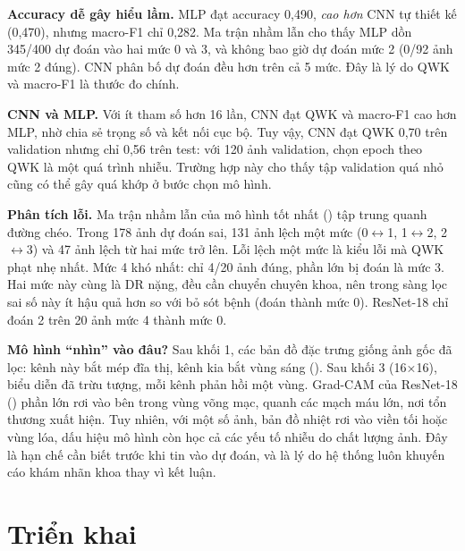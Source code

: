 \textbf{Accuracy dễ gây hiểu lầm.} MLP đạt accuracy 0,490, \emph{cao hơn} CNN tự thiết kế (0,470), nhưng macro-F1 chỉ 0,282. Ma trận nhầm lẫn cho thấy MLP dồn 345/400 dự đoán vào hai mức 0 và 3, và không bao giờ dự đoán mức 2 (0/92 ảnh mức 2 đúng). CNN phân bố dự đoán đều hơn trên cả 5 mức. Đây là lý do QWK và macro-F1 là thước đo chính.

\textbf{CNN và MLP.} Với ít tham số hơn 16 lần, CNN đạt QWK và macro-F1 cao hơn MLP, nhờ chia sẻ trọng số và kết nối cục bộ. Tuy vậy, CNN đạt QWK 0,70 trên validation nhưng chỉ 0,56 trên test: với 120 ảnh validation, chọn epoch theo QWK là một quá trình nhiễu. Trường hợp này cho thấy tập validation quá nhỏ cũng có thể gây quá khớp ở bước chọn mô hình.


\textbf{Phân tích lỗi.} Ma trận nhầm lẫn của mô hình tốt nhất () tập trung quanh đường chéo. Trong 178 ảnh dự đoán sai, 131 ảnh lệch một mức (0$\leftrightarrow$1, 1$\leftrightarrow$2, 2$\leftrightarrow$3) và 47 ảnh lệch từ hai mức trở lên. Lỗi lệch một mức là kiểu lỗi mà QWK phạt nhẹ nhất. Mức 4 khó nhất: chỉ 4/20 ảnh đúng, phần lớn bị đoán là mức 3. Hai mức này cùng là DR nặng, đều cần chuyển chuyên khoa, nên trong sàng lọc sai số này ít hậu quả hơn so với bỏ sót bệnh (đoán thành mức 0). ResNet-18 chỉ đoán 2 trên 20 ảnh mức 4 thành mức 0.



\textbf{Mô hình ``nhìn'' vào đâu?} Sau khối 1, các bản đồ đặc trưng giống ảnh gốc đã lọc: kênh này bắt mép đĩa thị, kênh kia bắt vùng sáng (). Sau khối 3 (16×16), biểu diễn đã trừu tượng, mỗi kênh phản hồi một vùng. Grad-CAM của ResNet-18 () phần lớn rơi vào bên trong vùng võng mạc, quanh các mạch máu lớn, nơi tổn thương xuất hiện. Tuy nhiên, với một số ảnh, bản đồ nhiệt rơi vào viền tối hoặc vùng lóa, dấu hiệu mô hình còn học cả các yếu tố nhiễu do chất lượng ảnh. Đây là hạn chế cần biết trước khi tin vào dự đoán, và là lý do hệ thống luôn khuyến cáo khám nhãn khoa thay vì kết luận.

\section{Triển khai}

